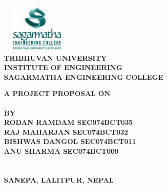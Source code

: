 \begin{titlingpage} 
\begin{normalsize}
\begin{center}
\includegraphics[width=1.5in, height=1in]{Graphics/logo.jpg}\\

\bfseries 
TRIBHUVAN UNIVERSITY\\
 INSTITUTE OF ENGINEERING\\

\textbf{SAGARMATHA ENGINEERING COLLEGE}\\
\end{center}
\vspace{0.8cm}

\begin{center}
\textbf{A PROJECT PROPOSAL ON}\\
\textbf{\thetitle} \\
\vspace{1.3cm}
\bfseries BY\\
\textbf{RODAN RAMDAM SEC074BCT035}\\
\textbf{RAJ MAHARJAN SEC074BCT032}\\
\textbf{BISHWAS DANGOL SEC074BCT011}\\
\textbf{ANU SHARMA SEC074BCT009}\\
\vspace{1.3cm}
\\
\vspace{1.5cm}
\bfseries {}\\
SANEPA, LALITPUR, NEPAL\\
\vspace{1.5cm}
\thedate
\end{center}
\end{normalsize}
\end{titlingpage}
\newpage